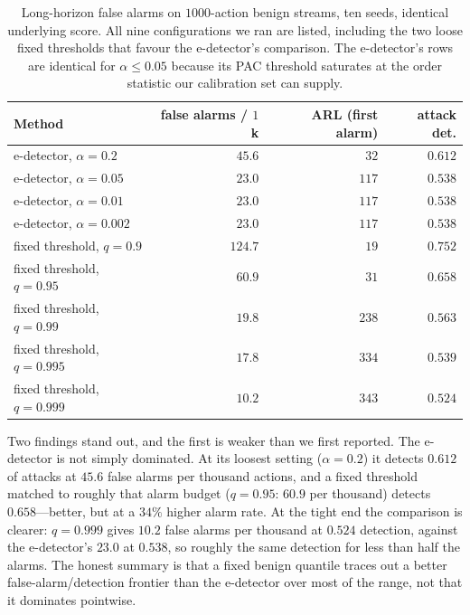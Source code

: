 \documentclass[preprint,12pt,number]{elsarticle}
\theoremstyle{definition}
\begin{document}
\begin{table}[htbp]
\centering
\caption{Long-horizon false alarms on $1000$-action benign streams, ten seeds,
identical underlying score. All nine configurations we ran are listed, including
the two loose fixed thresholds that favour the e-detector's comparison. The
e-detector's rows are identical for $\alpha \le 0.05$ because its PAC threshold
saturates at the order statistic our calibration set can supply.}
\label{tab:longhorizon}
\small
\begin{tabular}{@{}lrrr@{}}
\toprule
Method & false alarms / $1$k & ARL (first alarm) & attack det. \\
\midrule
e-detector, $\alpha=0.2$ & $45.6$ & $32$ & $0.612$ \\
e-detector, $\alpha=0.05$ & $23.0$ & $117$ & $0.538$ \\
e-detector, $\alpha=0.01$ & $23.0$ & $117$ & $0.538$ \\
e-detector, $\alpha=0.002$ & $23.0$ & $117$ & $0.538$ \\
fixed threshold, $q=0.9$ & $124.7$ & $19$ & $0.752$ \\
fixed threshold, $q=0.95$ & $60.9$ & $31$ & $0.658$ \\
fixed threshold, $q=0.99$ & $19.8$ & $238$ & $0.563$ \\
fixed threshold, $q=0.995$ & $17.8$ & $334$ & $0.539$ \\
fixed threshold, $q=0.999$ & $10.2$ & $343$ & $0.524$ \\
\bottomrule
\end{tabular}
\end{table}

Two findings stand out, and the first is weaker than we first reported. The
e-detector is not simply dominated. At its loosest setting ($\alpha = 0.2$) it
detects $0.612$ of attacks at $45.6$ false alarms per thousand actions, and a fixed
threshold matched to roughly that alarm budget ($q = 0.95$: $60.9$ per thousand)
detects $0.658$---better, but at a $34\%$ higher alarm rate. At the tight end the
comparison is clearer: $q = 0.999$ gives $10.2$ false alarms per thousand at
$0.524$ detection, against the e-detector's $23.0$ at $0.538$, so roughly the same
detection for less than half the alarms. The honest summary is that a fixed benign
quantile traces out a better false-alarm/detection frontier than the e-detector
over most of the range, not that it dominates pointwise.
\end{document}
